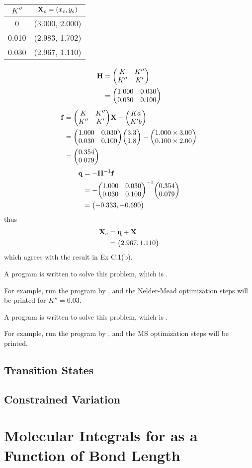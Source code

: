 \documentclass[a4paper]{article}
\begin{document}
\begin{table}
	\centering
	\begin{tabular}{cc}
		\hline
		$ K'' $ & $ \vb{X}_e = (x_e, y_e) $\\ \hline
		0 & (3.000, 2.000)\\
		0.010 & (2.983, 1.702)\\
		0.030 & (2.967, 1.110)\\ \hline
	\end{tabular}
\end{table}

\begin{align}
\vb{H} 
&= \mqty(K & K'' \\ K'' & K') \notag\\
&= \mqty(1.000 & 0.030\\ 0.030 & 0.100)
\end{align}
\begin{align}
\vb{f} 
&= \mqty(K & K'' \\ K'' & K')\vb{X} - \mqty(K a \\ K' b) \notag\\
&= \mqty(1.000 & 0.030\\ 0.030 & 0.100)\mqty(3.3\\ 1.8) 
- \mqty(1.000\times 3.00\\ 0.100\times 2.00) \notag\\
&= \mqty(0.354\\ 0.079)
\end{align}
\begin{align}
\vb{q} &= -\vb{H}^{-1}\vb{f} \notag\\
&= -\mqty(1.000 & 0.030\\ 0.030 & 0.100)^{-1} \mqty(0.354\\ 0.079) \notag\\
&= \mqty(-0.333, -0.690)
\end{align}
thus
\begin{align}
\vb{X}_e &= \vb{q} + \vb{X} \notag\\
&= \mqty(2.967, 1.110)
\end{align}
which agrees with the result in Ex C.1(b).

A program is written to solve this problem, which is . 

For example, run the program by
, and the Nelder-Mead optimization steps will be printed for $ K'' = 0.03 $.

A program is written to solve this problem, which is . 

For example, run the program by
, and the MS optimization steps will be printed.

\subsection{Transition States}

\subsection{Constrained Variation}

\section{Molecular Integrals for  as a Function of Bond Length}
\end{document}
